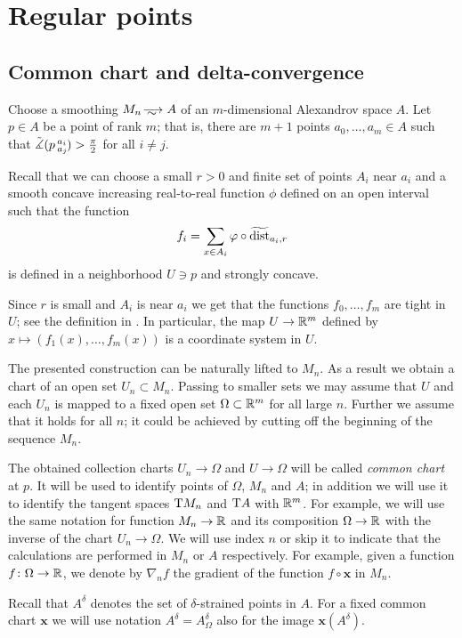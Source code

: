 \section{Regular points}\label{sec:ref}

\subsection{Common chart and delta-convergence}

Choose a smoothing $M_n\smooths{} A$ of an $m$-dimensional Alexandrov space $A$.
Let $p\in A$ be a point of rank $m$; that is, there are $m+1$ points $a_0,\dots, a_m\in A$ such that 
$\tilde\measuredangle(p\,{}^{a_i}_{a_j}\hspace{-0.2ex})>\tfrac\pi2$ for all $i\ne j$.

Recall that we can choose a small $r>0$ and finite set of points $A_i$ near $a_i$ and a smooth concave increasing real-to-real function $\phi$ defined on an open interval such that the function
\[f_i=\sum_{x\in A_i}\varphi\circ\widetilde{\operatorname{\rm dist}}_{a_i,r}\]
is defined in a neighborhood $U\ni p$ and strongly concave.

Since $r$ is small and $A_i$ is near $a_i$ we get that the functions $f_0, \dots, f_m$ are tight in $U$; see the definition in \cite{petrunin-conc}.
In particular, the map $U\to\mathbb{R}^m$ defined by $x\mapsto (f_1(x),\dots,f_m(x))$ is a coordinate system in $U$.

The presented construction can be naturally lifted to $M_n$.
As a result we obtain a chart of an open set $U_n\subset M_n$.
Passing to smaller sets we may assume that $U$ and each $U_n$ is mapped to a fixed open set $\Omega\subset\mathbb{R}^m$ for all large $n$.
Further we assume that it holds for all $n$; it could be achieved by cutting off the beginning of the sequence $M_n$.

The obtained collection charts $U_n\to \Omega$ and $U\to \Omega$ will be called \emph{common chart} at $p$.
It will be used to identify points of $\Omega$, $M_n$ and $A$; 
in addition we will use it to identify the tangent spaces $\mathrm{T} M_n$ and $\mathrm{T} A$ with $\mathbb{R}^m$.
For example, we will use the same notation for function $M_n\to \mathbb{R}$ and its composition $\Omega\to \mathbb{R}$ with the inverse of the chart $U_n\to \Omega$.
We will use index $n$ or skip it to indicate that the calculations are performed in $M_n$ or $A$ respectively.
For example, given a function $f\colon\Omega\to \mathbb{R}$, we denote by $\nabla_nf$ the gradient of the function $f\circ \bm{x}$ in $M_n$.

Recall that $A^\delta$ denotes the set of $\delta$-strained points in $A$.
For a fixed common chart $\bm{x}$ we will use notation $A^\delta=A^\delta_\Omega$ also for the image $\bm{x}(A^\delta)$.


